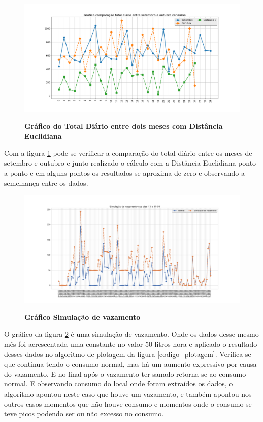 \begin{figure}[ht]
	\caption{\textbf{Gráfico do Total Diário entre dois meses com Distância Euclidiana}}
	\centering
		\includegraphics[width=\textwidth,height=\textheight , keepaspectratio]{figuras/comparacaototaldiarioentredoismesesconsumocomdistanciae}
		\label{graf_total_diaria_meses_d}
\end{figure}

\par Com a figura \ref{graf_total_diaria_meses_d} pode se verificar a comparação do total diário entre os meses de setembro e outubro e junto realizado o cálculo com a Distância Euclidiana ponto a ponto e em alguns pontos os resultados se aproxima de zero e observando a semelhança entre os dados.

\begin{figure}[ht]
	\caption{\textbf{Gráfico Simulação de vazamento}}
	\centering
		\includegraphics[width=\textwidth,height=\textheight , keepaspectratio]{figuras/Simulacaodevazamentonosdias13a17-09}
		\label{graf_simula_vaz}
\end{figure}

\par O gráfico da figura \ref{graf_simula_vaz} é uma simulação de vazamento. Onde os dados desse mesmo mês foi acrescentada uma constante no valor 50 litros hora e aplicado o resultado desses dados no algoritmo de plotagem da figura \ref{codigo_plotagem}.  Verifica-se que continua tendo o consumo normal, mas há um aumento expressivo  por causa do vazamento. E no final após o vazamento ter sanado retorna-se ao consumo normal. E observando consumo do local onde foram extraídos os dados, o algoritmo apontou neste caso que houve um vazamento, e também apontou-nos outros casos momentos que não houve consumo e momentos onde o consumo se teve picos podendo ser ou não excesso no consumo.

